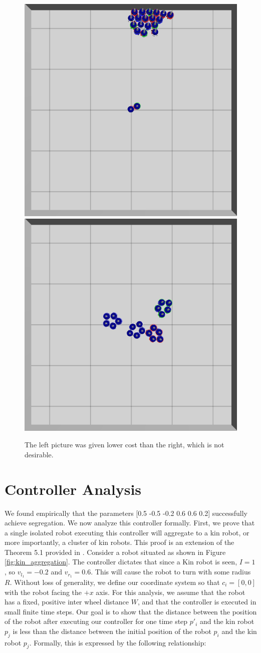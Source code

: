 \documentclass[conference]{IEEEtran}
\begin{document}
  \begin{figure}
    \centering
    \includegraphics[width=0.49\linewidth]{./images/individual_0_gen_0.png}
    \includegraphics[width=0.49\linewidth]{./images/individual_0_gen_1_better.png}
    \caption{The left picture was given lower cost than the right, which is not desirable.}
    \label{fig:cost_function_fuckup}
  \end{figure}



\section{Controller Analysis}

We found empirically that the parameters [0.5 -0.5 -0.2 0.6 0.6 0.2] successfully achieve segregation. We now analyze this controller formally. First, we prove that a single isolated robot executing this controller will aggregate to a kin robot, or more importantly, a cluster of kin robots. This proof is an extension of the Theorem 5.1 provided in \cite{gauci_self-organized_2014}. Consider a robot situated as shown in Figure \ref{fig:kin_aggregation}. The controller dictates that since a Kin robot is seen, $I=1$, so $v_{l_1} = -0.2$ and $v_{r_1} = 0.6$. This will cause the robot to turn with some radius $R$. Without loss of generality, we define our coordinate system so that $c_i=[0,0]$ with the robot facing the $+x$ axis. For this analysis, we assume that the robot has a fixed, positive inter wheel distance $W$, and that the controller is executed in small finite time steps. Our goal is to show that the distance between the position of the robot after executing our controller for one time step $p'_i$ and the kin robot $p_j$ is less than the distance between the initial position of the robot $p_i$ and the kin robot $p_j$. Formally, this is expressed by the following relationship:
\end{document}
